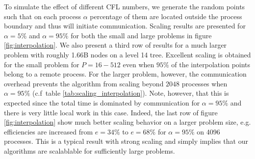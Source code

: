 To simulate the effect of different CFL numbers, we generate the random points such that on each process $\alpha$ percentage of them are located outside the process boundary and thus will initiate communication. Scaling results are presented for $\alpha = 5 \%$ and $\alpha = 95\%$ for both the small and large problems in figure \ref{fig:interpolation}. We also present a third row of results for a much larger problem with roughly 1.66B nodes on a level 14 tree. Excellent scaling is obtained for the small problem for $P = 16-512$ even when $95\%$ of the interpolation points belong to a remote process. For the larger problem, however, the communication overhead prevents the algorithm from scaling beyond $2048$ processes when $\alpha = 95\%$ (c.f\ table \ref{tab:scaling_interpolation}). Note, however, that this is expected since the total time is dominated by communication for $\alpha = 95\%$ and there is very little local work in this case. Indeed, the last row of figure \ref{fig:interpolation} show much better scaling behavior on a larger problem size, e.g. efficiencies are increased from $e=34\%$ to $e=68\%$ for $\alpha = 95\%$ on 4096 processes. This is a typical result with strong scaling and simply implies that our algorithms are scalablable for sufficiently large problems.
